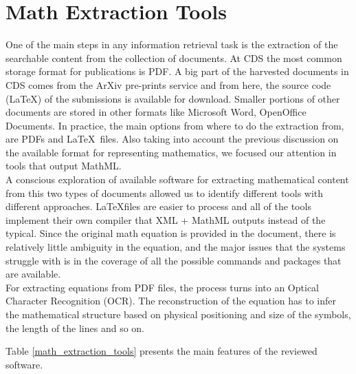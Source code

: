 \section{Math Extraction Tools}
One of the main steps in any information retrieval task is the extraction of the searchable content from the collection of documents. At CDS the most common storage format for publications is PDF. A big part of the harvested documents in CDS comes from the ArXiv pre-prints service and from here, the source code (\LaTeX) of the submissions is available for download. Smaller portions of other documents are stored in other formats like Microsoft Word, OpenOffice Documents.
In practice, the main options from where to do the extraction from, are PDFs and \LaTeX\ files. Also taking into account the previous discussion on the available format for representing mathematics, we focused our attention in tools that output MathML.  \\
A conscious exploration of available software for extracting mathematical content from this two types of documents allowed us to identify different tools with different approaches. 
\LaTeX  files are easier to process and all of the tools implement their own compiler that XML + MathML outputs instead of the typical. Since the original math equation is provided in the document, there is relatively little ambiguity in the equation, and the major issues that the systems struggle with is in the coverage of all the possible commands and packages that are available. \\
For extracting equations from PDF files, the process turns into an Optical Character Recognition (OCR). The reconstruction of the equation has to infer the mathematical structure based on physical positioning and size of the symbols, the length of the lines and so on.

Table \ref{math_extraction_tools} presents the main features of the reviewed software. 

